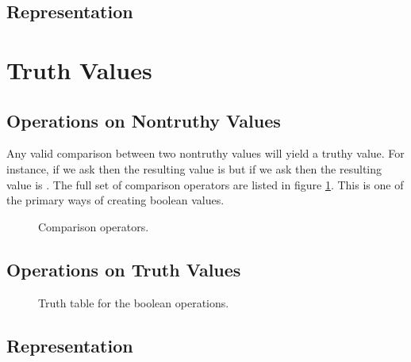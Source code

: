 \subsection{Representation}
\csharpsubsection{\csharp}

\section{Truth Values}
\label{primitives:bools}


\subsection{Operations on Nontruthy Values}

Any valid comparison between two nontruthy values will yield a truthy value. For instance, if we ask  then the resulting value is  but if we ask  then the resulting value is . The full set of comparison operators are listed in figure \ref{fig:prim:bool:comparison}. This is one of the primary ways of creating boolean values.

\begin{figure}[tbp]
  
  \caption{Comparison operators.}
  \label{fig:prim:bool:comparison}
\end{figure}

\subsection{Operations on Truth Values}

\begin{figure}[tbp]
  
  \caption{Truth table for the boolean operations.}
  \label{fig:prim:bool:and}
\end{figure}


\subsection{Representation}


\csharpsubsection{\csharp}

\begin{syntaxfloat}
  
  \caption{Expressions of boolean operators}
  \label{syntax:prim:bool:ops}
\end{syntaxfloat}

